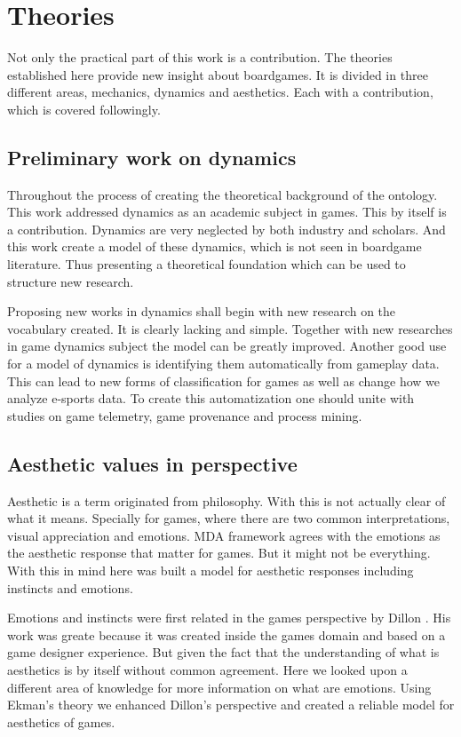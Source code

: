 
\section{Theories}

Not only the practical part of this work is a contribution. The theories established here provide new insight about boardgames. It is divided in three different areas, mechanics, dynamics and aesthetics. Each with a contribution, which is covered followingly.

\subsection{Preliminary work on dynamics}

Throughout the process of creating the theoretical background of the ontology. This work addressed dynamics as an academic subject in games. This by itself is a contribution. Dynamics are very neglected by both industry and scholars. And this work create a model of these dynamics, which is not seen in boardgame literature. Thus presenting a theoretical foundation which can be used to structure new research.

Proposing new works in dynamics shall begin with new research on the vocabulary created. It is clearly lacking and simple. Together with new researches in game dynamics subject the model can be greatly improved. Another good use for a model of dynamics is identifying them automatically from gameplay data. This can lead to new forms of classification for games as well as change how we analyze e-sports data. To create this automatization one should unite with studies on game telemetry, game provenance and process mining.

\subsection{Aesthetic values in perspective}

Aesthetic is a term originated from philosophy. With this is not actually clear of what it means. Specially for games, where there are two common interpretations, visual appreciation and emotions. MDA  framework \cite{Hunicke2004} agrees with the emotions as the aesthetic response that matter for games. But it might not be everything. With this in mind here was built a model for aesthetic responses including instincts and emotions.

Emotions and instincts were first related in the games perspective by Dillon \cite{dillon_way_2010}. His work was greate because it was created inside the games domain and based on a game designer experience. But given the fact that the understanding of what is aesthetics is by itself without common agreement. Here we looked upon a different area of knowledge for more information on what are emotions. Using Ekman's \cite{ekmans_atlas} theory we enhanced Dillon's perspective and created a reliable model for aesthetics of games.

